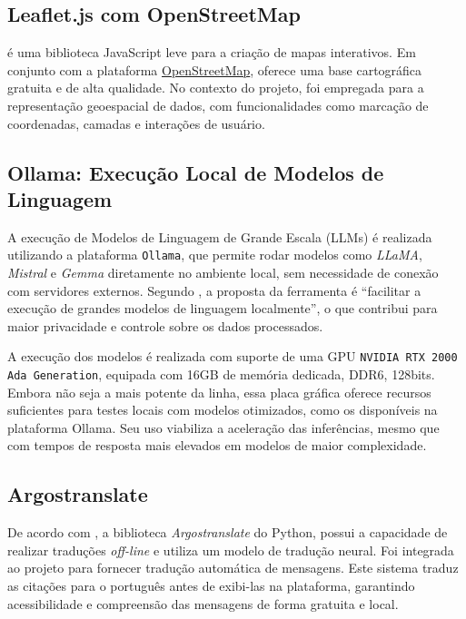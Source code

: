 \subsection{Leaflet.js com OpenStreetMap}
\par {} é uma biblioteca JavaScript leve para a criação de mapas interativos. Em conjunto com a plataforma \href{https://www.openstreetmap.org/#map=7/-26.613/-50.746}{OpenStreetMap}, oferece uma base cartográfica gratuita e de alta qualidade. No contexto do projeto, foi empregada para a representação geoespacial de dados, com funcionalidades como marcação de coordenadas, camadas e interações de usuário.


\subsection{Ollama: Execução Local de Modelos de Linguagem}
\par A execução de Modelos de Linguagem de Grande Escala (LLMs) é realizada utilizando a plataforma \texttt{Ollama}, que permite rodar modelos como \textit{LLaMA}, \textit{Mistral} e \textit{Gemma} diretamente no ambiente local, sem necessidade de conexão com servidores externos. Segundo , a proposta da ferramenta é “facilitar a execução de grandes modelos de linguagem localmente”, o que contribui para maior privacidade e controle sobre os dados processados.
\par A execução dos modelos é realizada com suporte de uma GPU \texttt{NVIDIA RTX 2000 Ada Generation}, equipada com 16GB de memória dedicada, DDR6, 128bits. Embora não seja a mais potente da linha, essa placa gráfica oferece recursos suficientes para testes locais com modelos otimizados, como os disponíveis na plataforma Ollama. Seu uso viabiliza a aceleração das inferências, mesmo que com tempos de resposta mais elevados em modelos de maior complexidade.

\subsection{Argostranslate}
\par De acordo com , a biblioteca \textit{Argostranslate} do Python, possui a capacidade de realizar traduções \textit{off-line} e utiliza um modelo de tradução neural. Foi integrada ao projeto para fornecer tradução automática de mensagens. Este sistema traduz as citações para o português antes de exibi-las na plataforma, garantindo acessibilidade e compreensão das mensagens de forma gratuita e local.

